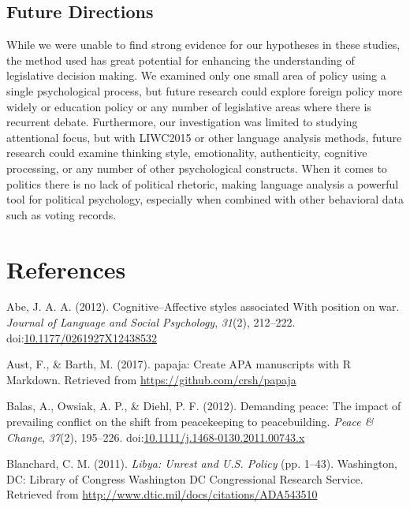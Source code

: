 \documentclass[english,man]{apa6}
\theoremstyle{definition}
\theoremstyle{definition}
\theoremstyle{definition}
\theoremstyle{remark}
\begin{document}
\subsection{Future Directions}\label{future-directions}

While we were unable to find strong evidence for our hypotheses in these
studies, the method used has great potential for enhancing the
understanding of legislative decision making. We examined only one small
area of policy using a single psychological process, but future research
could explore foreign policy more widely or education policy or any
number of legislative areas where there is recurrent debate.
Furthermore, our investigation was limited to studying attentional
focus, but with LIWC2015 or other language analysis methods, future
research could examine thinking style, emotionality, authenticity,
cognitive processing, or any number of other psychological constructs.
When it comes to politics there is no lack of political rhetoric, making
language analysis a powerful tool for political psychology, especially
when combined with other behavioral data such as voting records.

\newpage

\section{References}\label{references}

\setlength{\parindent}{-0.5in} \setlength{\leftskip}{0.5in}

\hypertarget{refs}{}
\hypertarget{ref-Abe2012}{}
Abe, J. A. A. (2012). Cognitive--Affective styles associated With
position on war. \emph{Journal of Language and Social Psychology},
\emph{31}(2), 212--222.
doi:\href{https://doi.org/10.1177/0261927X12438532}{10.1177/0261927X12438532}

\hypertarget{ref-Aust2017}{}
Aust, F., \& Barth, M. (2017). papaja: Create APA manuscripts with R
Markdown. Retrieved from \url{https://github.com/crsh/papaja}

\hypertarget{ref-Balas2012}{}
Balas, A., Owsiak, A. P., \& Diehl, P. F. (2012). Demanding peace: The
impact of prevailing conflict on the shift from peacekeeping to
peacebuilding. \emph{Peace \& Change}, \emph{37}(2), 195--226.
doi:\href{https://doi.org/10.1111/j.1468-0130.2011.00743.x}{10.1111/j.1468-0130.2011.00743.x}

\hypertarget{ref-Blanchard2011}{}
Blanchard, C. M. (2011). \emph{Libya: Unrest and U.S. Policy} (pp.
1--43). Washington, DC: Library of Congress Washington DC Congressional
Research Service. Retrieved from
\url{http://www.dtic.mil/docs/citations/ADA543510}
\end{document}
